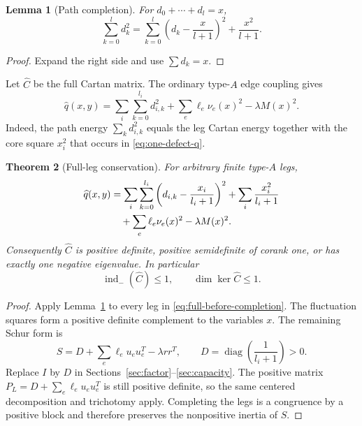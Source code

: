 \documentclass[11pt,a4paper]{amsart}
\theoremstyle{plain}
\newtheorem{theorem}{Theorem}[section]
\newtheorem{lemma}[theorem]{Lemma}
\theoremstyle{definition}
\newcommand{\indm}{\operatorname{ind}_{-}}
\newcommand{\diag}{\operatorname{diag}}
\begin{document}
\begin{lemma}[Path completion]\label{lem:path-completion}
For $d_0+\cdots+d_l=x$,
\begin{equation}\label{eq:path-completion}
 \sum_{k=0}^l d_k^2
 =\sum_{k=0}^l\left(d_k-\frac{x}{l+1}\right)^2+\frac{x^2}{l+1}.
\end{equation}
\end{lemma}

\begin{proof}
Expand the right side and use $\sum d_k=x$.
\end{proof}

Let $\widehat C$ be the full Cartan matrix.  The ordinary type-$A$ edge coupling gives
\begin{equation}\label{eq:full-before-completion}
 \widehat q(x,y)=
 \sum_i\sum_{k=0}^{l_i}d_{i,k}^2
 +\sum_e\ell_e\nu_e(x)^2-\lambda M(x)^2.
\end{equation}
Indeed, the path energy $\sum_kd_{i,k}^2$ equals the leg Cartan energy together with the core
square $x_i^2$ that occurs in \eqref{eq:one-defect-q}.

\begin{theorem}[Full-leg conservation]\label{thm:full-leg}
For arbitrary finite type-$A$ legs,
\begin{align}\label{eq:full-completed}
 \widehat q(x,y)
 &=\sum_i\sum_{k=0}^{l_i}
     \left(d_{i,k}-\frac{x_i}{l_i+1}\right)^2
   +\sum_i\frac{x_i^2}{l_i+1}\notag\\
 &\quad+\sum_e\ell_e\nu_e(x)^2-\lambda M(x)^2.
\end{align}
Consequently $\widehat C$ is positive definite, positive semidefinite of corank one, or has
exactly one negative eigenvalue.  In particular
\begin{equation}\label{eq:full-index}
                 \indm(\widehat C)\le1,\qquad
                 \dim\ker\widehat C\le1.
\end{equation}
\end{theorem}

\begin{proof}
Apply Lemma~\ref{lem:path-completion} to every leg in
\eqref{eq:full-before-completion}.  The fluctuation squares form a positive definite complement
to the variables $x$.  The remaining Schur form is
\begin{equation}\label{eq:leg-Schur}
 S=D+\sum_e\ell_eu_eu_e^T-\lambda rr^T,\qquad
 D=\diag\left(\frac1{l_i+1}\right)>0.
\end{equation}
Replace $I$ by $D$ in Sections~\ref{sec:factor}--\ref{sec:capacity}.  The positive matrix
$P_L=D+\sum_e\ell_eu_eu_e^T$ is still positive definite, so the same centered decomposition and
trichotomy apply.  Completing the legs is a congruence by a positive block and therefore preserves
the nonpositive inertia of $S$.
\end{proof}
\end{document}
